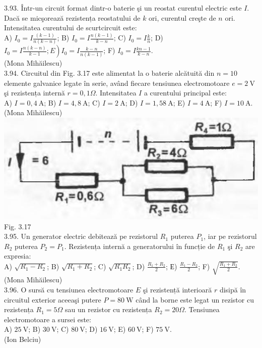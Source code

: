 \documentclass[10pt]{article}
\begin{document}
3.93. Într-un circuit format dintr-o baterie şi un reostat curentul electric este $I$. Dacă se micşorează rezistența reostatului de $k$ ori, curentul creşte de $n$ ori. Intensitatea curentului de scurtcircuit este:\\ A) $I_{0}=I \frac{(k-1)}{n(k-n)}$; B) $I_{0}=I \frac{n(k-1)}{k-n}$; C) $I_{0}=I \frac{k}{n}$; D) $\left.I_{0}=I \frac{n(k-n)}{k-1} ; E\right) I_{0}=I \frac{k-n}{n(k-1)}$; F) $I_{0}=I \frac{k n-1}{k-n}$.\\ (Mona Mihăilescu)\\

3.94. Circuitul din Fig. 3.17 este alimentat la o baterie alcătuită din $n=10$ elemente galvanice legate în serie, având fiecare tensiunea electromotoare $e=2 \mathrm{~V}$ şi rezistența internă $r=0,1 \Omega$. Intensitatea $I$ a curentului principal este:\\ A) $I=0,4 \mathrm{~A}$; B) $I=4,8 \mathrm{~A}$; C) $I=2 \mathrm{~A}$; D) $I=1,58 \mathrm{~A}$; E) $I=4 \mathrm{~A}$; F) $I=10 \mathrm{~A}$.\\ (Mona Mihăilescu)\\ \includegraphics[max width=\textwidth, center]{2025_07_01_5b3ff9fa0d508c8e9f17g-164} Fig. 3.17\\

3.95. Un generator electric debitează pe rezistorul $R_{1}$ puterea $P_{1}$, iar pe rezistorul $R_{2}$ puterea $P_{2}=P_{1}$. Rezistența internă a generatorului în funcție de $R_{1}$ şi $R_{2}$ are expresia:\\ A) $\sqrt{R_{1}-R_{2}}$; B) $\sqrt{R_{1}+R_{2}}$; C) $\sqrt{R_{1} R_{2}}$; D) $\frac{R_{1}+R_{2}}{2}$; Е) $\frac{R_{1}-R_{2}}{2}$; F) $\sqrt{\frac{R_{1}+R_{2}}{2}}$.\\ (Mona Mihăilescu)\\

3.96. O sursă cu tensiunea electromotoare $E$ şi rezistență interioară $r$ disipă în circuitul exterior aceeaşi putere $P=80 \mathrm{~W}$ când la borne este legat un rezistor cu rezistența $R_{1}=5 \Omega$ sau un rezistor cu rezistența $R_{2}=20 \Omega$. Tensiunea electromotoare a sursei este:\\ A) $25 \mathrm{~V}$; B) $30 \mathrm{~V}$; C) $80 \mathrm{~V}$; D) $16 \mathrm{~V}$; E) $60 \mathrm{~V}$; F) $75 \mathrm{~V}$.\\ (Ion Belciu)\\
\end{document}

